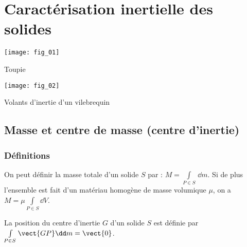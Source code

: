 \setchapterpreamble[u]{\margintoc}

\chapter{Caractérisation inertielle des solides}




\begin{marginfigure}[6.5cm]
\centering
\texttt{[image: fig\_01]}
\caption{Toupie}
\end{marginfigure}


\begin{marginfigure}[10.5cm]
\centering
\texttt{[image: fig\_02]}
\caption{Volants d'inertie d'un vilebrequin}
\end{marginfigure}



\section{Masse et centre de masse (centre d'inertie)}
\subsection{Définitions}
\begin{defi}
On peut définir la masse totale d'un solide $S$ par : $M=\int\limits_{P\in S} \,\dd m$. Si de plus l'ensemble est fait d'un matériau homogène de masse volumique $\mu$, on a $M=\mu \int\limits_{P\in S} \dd V$. \end{defi}


\begin{defi}
La position du centre d'inertie $G$ d'un solide $S$ est définie par $\int\limits_{P\in S} \vect{GP} \dd m = \vect{0}$.
\end{defi}

